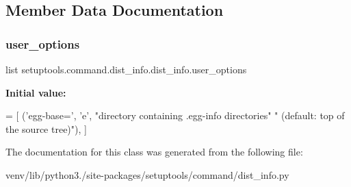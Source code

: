 \subsection{Member Data Documentation}
\mbox{\label{classsetuptools_1_1command_1_1dist__info_1_1dist__info_ac80b6554c63458f2a5d11d369a83706c}} 
\subsubsection{\texorpdfstring{user\+\_\+options}{user\_options}}
{\footnotesize\ttfamily list setuptools.\+command.\+dist\+\_\+info.\+dist\+\_\+info.\+user\+\_\+options\hspace{0.3cm}{\ttfamily [static]}}

{\bfseries Initial value\+:}
\begin{DoxyCode}
=  [
        (\textcolor{stringliteral}{'egg-base='}, \textcolor{stringliteral}{'e'}, \textcolor{stringliteral}{"directory containing .egg-info directories"}
                           \textcolor{stringliteral}{" (default: top of the source tree)"}),
    ]
\end{DoxyCode}


The documentation for this class was generated from the following file\+:\begin{DoxyCompactItemize}
\item 
venv/lib/python3./site-\/packages/setuptools/command/dist\+\_\+info.\+py\end{DoxyCompactItemize}
